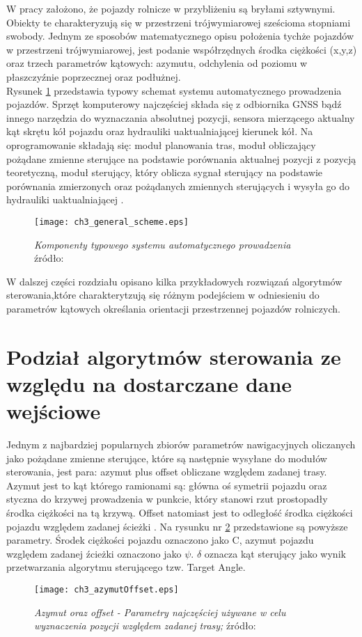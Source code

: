 W pracy założono, że pojazdy rolnicze w przybliżeniu są bryłami sztywnymi.
Obiekty te charakteryzują się w przestrzeni trójwymiarowej sześcioma stopniami swobody.
Jednym ze sposobów matematycznego opisu położenia tychże pojazdów w przestrzeni trójwymiarowej,
jest podanie współrzędnych środka ciężkości (x,y,z) oraz trzech parametrów kątowych: azymutu, odchylenia od poziomu w płaszczyźnie poprzecznej oraz podłużnej.\\
\indent Rysunek \ref{fig:general_scheme} przedstawia typowy schemat systemu automatycznego prowadzenia pojazdów. Sprzęt komputerowy najczęściej składa się z 
odbiornika GNSS bądź innego narzędzia do wyznaczania absolutnej pozycji, sensora mierzącego aktualny kąt skrętu kół pojazdu oraz hydrauliki uaktualniającej kierunek kół.
Na oprogramowanie składają się: moduł planowania tras, moduł obliczający pożądane zmienne sterujące na podstawie porównania aktualnej pozycji z pozycją teoretyczną,
moduł sterujący, który oblicza sygnał sterujący na podstawie porównania zmierzonych oraz pożądanych zmiennych sterujących i wysyła go do hydrauliki uaktualniającej
\cite[][strona 1097]{automation_in_agriculture}.

\begin{figure}[H]
\centering
\texttt{[image: ch3\_general\_scheme.eps]}
\caption{\textit{Komponenty typowego systemu automatycznego prowadzenia}\\
źródło: \cite[][strona 1097]{automation_in_agriculture}}
\label{fig:general_scheme}
\end{figure}

\indent W dalszej części rozdziału opisano kilka przykładowych rozwiązań algorytmów sterowania,które charakterytzują się różnym podejściem 
w odniesieniu do parametrów kątowych określania orientacji przestrzennej pojazdów rolniczych. 
\section{Podział algorytmów sterowania ze względu na dostarczane dane wejściowe}
Jednym z najbardziej popularnych zbiorów parametrów nawigacyjnych oliczanych jako pożądane zmienne sterujące, które są następnie wysyłane do modułów sterowania, jest para:
azymut plus offset obliczane względem zadanej trasy. Azymut jest to kąt którego ramionami są:
główna oś symetrii pojazdu oraz styczna do krzywej prowadzenia w punkcie, który stanowi rzut prostopadły środka ciężkości na tą krzywą.
Offset natomiast jest to odległość środka ciężkości pojazdu względem zadanej ścieżki \cite{CCTA_769_775}.
Na rysunku nr \ref{fig:ch3_azymutOffset} przedstawione są powyższe parametry. Środek ciężkości pojazdu oznaczono jako C,
azymut pojazdu względem zadanej źcieżki oznaczono jako $\psi$. $\delta$ oznacza kąt sterujący jako wynik przetwarzania algorytmu sterującego tzw. Target Angle.    
\begin{figure}[H] 
\centering
\texttt{[image: ch3\_azymutOffset.eps]}
\caption{\textit{Azymut oraz offset - Parametry najczęściej używane w celu wyznaczenia pozycji względem zadanej trasy;}
źródło: \cite[][strona 464]{CCTA5_461_469}}
\label{fig:ch3_azymutOffset}
\end{figure}

